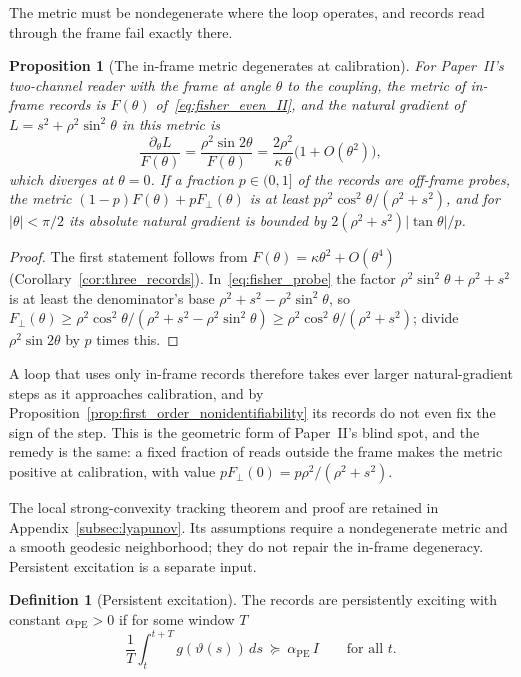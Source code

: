 \documentclass[12pt]{article}
\newtheorem{proposition}[theorem]{Proposition}
\theoremstyle{definition}
\newtheorem{definition}[theorem]{Definition}
\begin{document}
The metric must be nondegenerate where the loop operates, and records read through the frame fail exactly there.

\begin{proposition}[The in-frame metric degenerates at calibration]
\label{prop:degenerate}
For Paper~II's two-channel reader with the frame at angle $\theta$ to the coupling, the metric of in-frame records is $F(\theta)$ of~\eqref{eq:fisher_even_II}, and the natural gradient of $L=s^2+\rho^2\sin^2\theta$ in this metric is
\[
\frac{\partial_\theta L}{F(\theta)}=\frac{\rho^2\sin2\theta}{F(\theta)}=\frac{2\rho^2}{\kappa\,\theta}\bigl(1+O(\theta^2)\bigr),
\]
which diverges at $\theta=0$. If a fraction $p\in(0,1]$ of the records are off-frame probes, the metric $(1-p)F(\theta)+pF_\perp(\theta)$ is at least $p\rho^2\cos^2\theta/(\rho^2+s^2)$, and for $|\theta|<\pi/2$ its absolute natural gradient is bounded by $2(\rho^2+s^2)|\tan\theta|/p$.
\end{proposition}

\begin{proof}
The first statement follows from $F(\theta)=\kappa\theta^2+O(\theta^4)$ (Corollary~\ref{cor:three_records}). In~\eqref{eq:fisher_probe} the factor $\rho^2\sin^2\theta+\rho^2+s^2$ is at least the denominator's base $\rho^2+s^2-\rho^2\sin^2\theta$, so $F_\perp(\theta)\ge\rho^2\cos^2\theta/(\rho^2+s^2-\rho^2\sin^2\theta)\ge\rho^2\cos^2\theta/(\rho^2+s^2)$; divide $\rho^2\sin2\theta$ by $p$ times this.
\end{proof}

A loop that uses only in-frame records therefore takes ever larger natural-gradient steps as it approaches calibration, and by Proposition~\ref{prop:first_order_nonidentifiability} its records do not even fix the sign of the step. This is the geometric form of Paper~II's blind spot, and the remedy is the same: a fixed fraction of reads outside the frame makes the metric positive at calibration, with value $pF_\perp(0)=p\rho^2/(\rho^2+s^2)$.

The local strong-convexity tracking theorem and proof are retained in
Appendix~\ref{subsec:lyapunov}. Its assumptions require a nondegenerate
metric and a smooth geodesic neighborhood; they do not repair the
in-frame degeneracy. Persistent excitation is a separate input.

\begin{definition}[Persistent excitation]
\label{def:PE_constant}
The records are persistently exciting with constant $\alpha_{\mathrm{PE}}>0$ if for some window $T$
\begin{equation}
\label{eq:PE_constant}
\frac1T\int_t^{t+T}g(\vartheta(s))\,ds\ \succeq\ \alpha_{\mathrm{PE}}\,I\qquad\text{for all }t.
\end{equation}
\end{definition}
\end{document}
